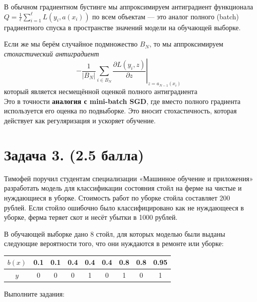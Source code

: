 \documentclass[12pt,a4paper]{article}
\begin{document}
В обычном градиентном бустинге мы аппроксимируем антиградиент
функционала $Q = \frac{1}{\ell}\sum_{i=1}^{\ell} L(y_i, a(x_i))$
по всем объектам --- это аналог полного (batch) градиентного спуска
в пространстве значений модели на обучающей выборке.

Если же мы берём случайное подмножество $B_N$, то мы аппроксимируем
\emph{стохастический антиградиент}
\[
-\frac{1}{|B_N|}\sum_{i\in B_N}
\left.\frac{\partial L(y_i,z)}{\partial z}\right|_{z=a_{N-1}(x_i)}
\]
который является несмещённой оценкой полного антиградиента\\[1mm]
Это в точности \textbf{аналогия с mini-batch SGD}, где вместо полного градиента
используется его оценка по подвыборке. Это вносит стохастичность,
которая действует как регуляризация и ускоряет обучение.

\section*{Задача 3. (2.5 балла)}

Тимофей поручил студентам специализации «Машинное обучение и приложения»
разработать модель для классификации состояния стойл на ферме на чистые и
нуждающиеся в уборке. Стоимость работ по уборке стойла составляет 200 рублей.
Если стойло ошибочно было классифицировано как не нуждающееся в уборке,
ферма теряет скот и несёт убытки в 1000 рублей.

В обучающей выборке дано 8 стойл, для которых моделью были выданы следующие
вероятности того, что они нуждаются в ремонте или уборке:

\begin{center}
\begin{tabular}{c|cccccccc}
$b(x)$ & 0.1 & 0.1 & 0.4 & 0.4 & 0.4 & 0.8 & 0.8 & 0.95 \\
\midrule
$y$     & 0   & 0   & 0   & 1   & 0   & 1   & 0   & 1
\end{tabular}
\end{center}

Выполните задания:
\end{document}

